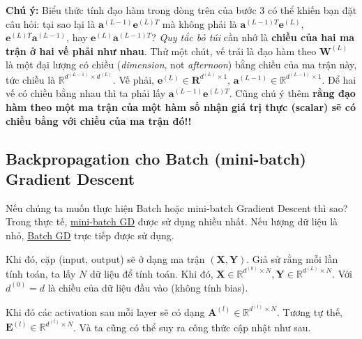 \textbf{Chú ý:} Biểu thức tính đạo hàm trong dòng trên của bước 3 có thể khiến bạn đặt câu hỏi: tại sao lại là $\mathbf{a}^{(L-1)}\mathbf{e}^{(L)T}$ mà không phải là $\mathbf{a}^{(L-1)T}\mathbf{e}^{(L)}$, $\mathbf{e}^{(L)T}\mathbf{a}^{(L-1)}$, hay $\mathbf{e}^{(L)}\mathbf{a}^{(L-1)T}$? \textit{Quy tắc bỏ túi} cần nhớ là \textbf{chiều của hai ma trận ở hai vế phải như nhau}. Thử một chút, vế trái là đạo hàm theo $\mathbf{W}^{(L)}$ là một đại lượng có chiều (\textit{dimension}, not \textit{afternoon}) bằng chiều của ma trận này, tức chiều là $\mathbb{R}^{d^{(L-1)}\times d^{(L)}}$. Vế phải, $\mathbf{e}^{(L)} \in \mathbf{R}^{d^{(L)} \times 1}$, $\mathbf{a}^{(L-1)} \in \mathbb{R}^{d^{(L-1)} \times 1}$. Để hai vế có chiều bằng nhau thì ta phải lấy $\mathbf{a}^{(L-1)} \mathbf{e}^{(L)T}$. Cũng chú ý thêm \textbf{rằng đạo hàm theo một ma trận của một hàm số nhận giá trị thực (scalar) sẽ có chiều bằng với chiều của ma trận đó!!} 
 
 
\subsection{Backpropagation cho Batch (mini-batch) Gradient Descent}
 
Nếu chúng ta muốn thực hiện Batch hoặc mini-batch Gradient Descent thì sao? Trong thực tế, \href{http://machinelearningcoban.com/2017/01/16/gradientdescent2/#-mini-batch-gradient-descent}{mini-batch GD} được sử dụng nhiều nhất. Nếu lượng dữ liệu là nhỏ, \href{http://machinelearningcoban.com/2017/01/16/gradientdescent2/#-batch-gradient-descent}{Batch GD} trực tiếp được sử dụng. 
 
Khi đó, cặp (input, output) sẽ ở dạng ma trận $(\mathbf{X, Y})$. Giả sử rằng mỗi lần tính toán, ta lấy $N$ dữ liệu để tính toán. Khi đó, $\mathbf{X} \in \mathbb{R}^{d^{(0)} \times N}, \mathbf{Y} \in \mathbb{R}^{d^{(L)}\times N}$. Với $d^{(0)} = d$ là chiều của dữ liệu đầu vào (không tính bias). 
 
 Khi đó các activation sau mỗi layer sẽ có dạng $\mathbf{A}^{(l)} \in \mathbb{R}^{d^{(l)} \times N}$. Tương tự thế, $\mathbf{E}^{(l)} \in \mathbb{R}^{d^{(l)}\times N}$. Và ta cũng có thể suy ra công thức cập nhật như sau. 
 
